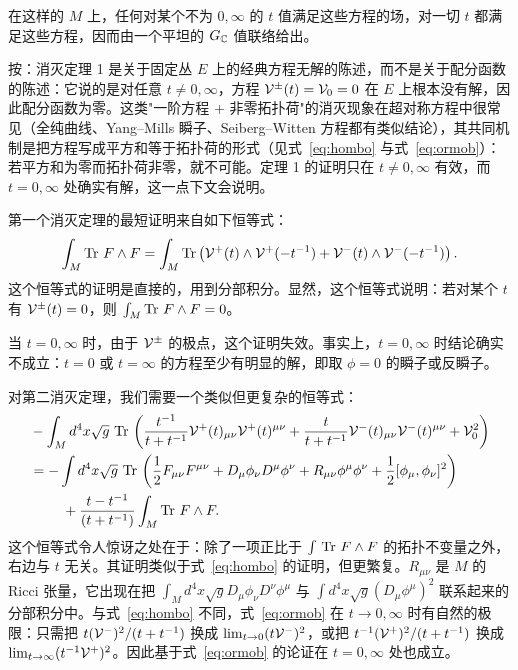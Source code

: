 \par{} 在这样的 $M$ 上，任何对某个不为 $0,\infty$ 的 $t$ 值满足这些方程的场，对一切 $t$ 都满足这些方程，因而由一个平坦的 $G_\Bbb{C}$ 值联络给出。

\begin{yizhu}[易错点]
按：消灭定理 1 是关于固定丛 $E$ 上的经典方程无解的陈述，而不是关于配分函数的陈述：它说的是对任意 $t\not=0,\infty$，方程 $\EUV^\pm(t)=\EUV_0=0$ 在 $E$ 上根本没有解，因此配分函数为零。这类"一阶方程 + 非零拓扑荷"的消灭现象在超对称方程中很常见（全纯曲线、Yang--Mills 瞬子、Seiberg--Witten 方程都有类似结论），其共同机制是把方程写成平方和等于拓扑荷的形式（见式~\eqref{eq:hombo} 与式~\eqref{eq:ormob}）：若平方和为零而拓扑荷非零，就不可能。定理 1 的证明只在 $t\not=0,\infty$ 有效，而 $t=0,\infty$ 处确实有解，这一点下文会说明。
\end{yizhu}

\par\medskip

第一个消灭定理的最短证明来自如下恒等式： %
\setcounter{equation}{31}
\begin{equation}\label{eq:hombo}
\int_M\Tr\,F\wedge
F=\int_M\Tr\left(\EUV^+(t)\wedge \EUV^+(-t^{-1})+\EUV^-(t)\wedge
\EUV^-(-t^{-1})\right).
\end{equation}
这个恒等式的证明是直接的，用到分部积分。显然，这个恒等式说明：若对某个 $t$ 有 $\EUV^\pm(t)=0$，则 $\int_M\Tr\, F\wedge F=0$。

当 $t=0,\infty$ 时，由于 $\EUV^\pm$ 的极点，这个证明失效。事实上，$t=0,\infty$ 时结论确实不成立：$t=0$ 或 $t=\infty$ 的方程至少有明显的解，即取 $\phi=0$ 的瞬子或反瞬子。

对第二消灭定理，我们需要一个类似但更复杂的恒等式： %
\setcounter{equation}{32}
\begin{equation}\label{eq:ormob}
\begin{aligned}&-\int_Md^4x\sqrt
g\,\Tr\,\left({t^{-1}\over
t+t^{-1}}\EUV^+(t)_{\mu\nu}\EUV^+(t)^{\mu\nu}+{t\over
t+t^{-1}}\EUV^-(t)_{\mu\nu}\EUV^-(t)^{\mu\nu}+\EUV_0^2\right)\\
&=-\int d^4x\sqrt g\,\Tr\,\left({1\over 2}F_{\mu\nu}
F^{\mu\nu}+D_\mu\phi_\nu D^\mu\phi^\nu
+R_{\mu\nu}\phi^\mu\phi^\nu+ {1\over
2}[\phi_\mu,\phi_\nu]^2\right)\\&~~~~~~~+{t-t^{-1}\over
(t+t^{-1})}\int_M\Tr\, F\wedge F. \\\end{aligned}
\end{equation}
这个恒等式令人惊讶之处在于：除了一项正比于 $\int\,\Tr\,F\wedge F$ 的拓扑不变量之外，右边与 $t$ 无关。其证明类似于式~\eqref{eq:hombo} 的证明，但更繁复。$R_{\mu\nu}$ 是 $M$ 的 Ricci 张量，它出现在把 $\int_Md^4x\sqrt g D_\mu\phi_\nu D^\nu\phi^\mu$ 与 $\int d^4x\sqrt g (D_\mu\phi^\mu)^2$ 联系起来的分部积分中。与式~\eqref{eq:hombo} 不同，式~\eqref{eq:ormob} 在 $t\to 0,\infty$ 时有自然的极限：只需把 $t (\EUV^-)^2/(t+t^{-1})$ 换成 $\lim_{t\to 0}(t\EUV^-)^2$，或把 $t^{-1}(\EUV^+)^2/(t+t^{-1})$ 换成 $\lim_{t\to \infty}(t^{-1}\EUV^+)^2$。因此基于式~\eqref{eq:ormob} 的论证在 $t=0,\infty$ 处也成立。

